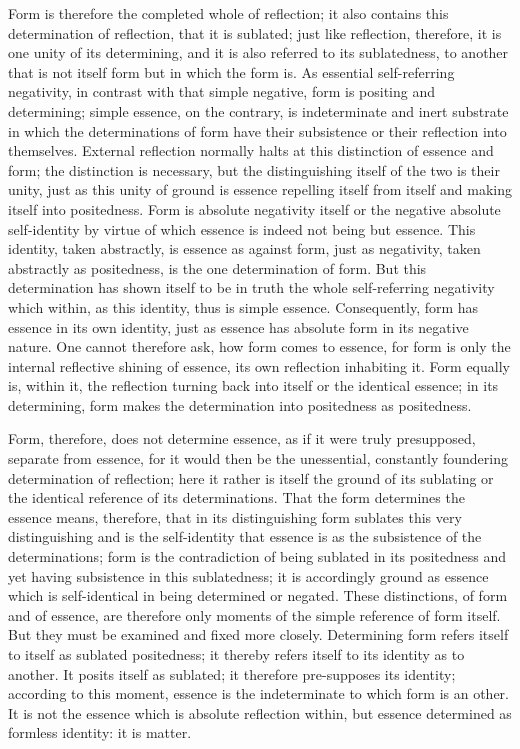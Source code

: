 Form is therefore the completed whole of reflection;
it also contains this determination of reflection, that it is sublated;
just like reflection, therefore, it is one unity of its determining,
and it is also referred to its sublatedness,
to another that is not itself form but in which the form is.
As essential self-referring negativity,
in contrast with that simple negative,
form is positing and determining;
simple essence, on the contrary, is indeterminate and inert
substrate in which the determinations of form have their subsistence
or their reflection into themselves.
External reflection normally halts at
this distinction of essence and form;
the distinction is necessary,
but the distinguishing itself of the two is their unity,
just as this unity of ground is essence repelling itself from itself
and making itself into positedness.
Form is absolute negativity itself
or the negative absolute self-identity
by virtue of which essence is indeed not being but essence.
This identity, taken abstractly, is essence as against form,
just as negativity, taken abstractly as positedness,
is the one determination of form.
But this determination has shown itself to be in truth
the whole self-referring negativity
which within, as this identity, thus is simple essence.
Consequently, form has essence in its own identity,
just as essence has absolute form in its negative nature.
One cannot therefore ask, how form comes to essence,
for form is only the internal reflective shining of essence,
its own reflection inhabiting it.
Form equally is, within it,
the reflection turning back into itself
or the identical essence;
in its determining, form makes the determination
into positedness as positedness.

Form, therefore, does not determine essence,
as if it were truly presupposed, separate from essence,
for it would then be the unessential,
constantly foundering determination of reflection;
here it rather is itself the ground of its sublating
or the identical reference of its determinations.
That the form determines the essence means, therefore,
that in its distinguishing form sublates this very distinguishing
and is the self-identity that essence is
as the subsistence of the determinations;
form is the contradiction of being sublated in its positedness
and yet having subsistence in this sublatedness;
it is accordingly ground as essence which
is self-identical in being determined or negated.
These distinctions, of form and of essence,
are therefore only moments of the simple reference of form itself.
But they must be examined and fixed more closely.
Determining form refers itself to itself as sublated positedness;
it thereby refers itself to its identity as to another.
It posits itself as sublated;
it therefore pre-supposes its identity;
according to this moment, essence is the indeterminate
to which form is an other.
It is not the essence which is absolute reflection within,
but essence determined as formless identity:
it is matter.


